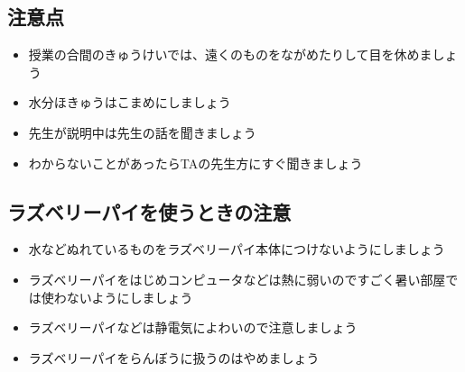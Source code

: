 \subsection{注意点}
\begin{itemize}
\item
授業の合間のきゅうけいでは、遠くのものをながめたりして目を休めましょう
\item 水分ほきゅうはこまめにしましょう
\item
先生が説明中は先生の話を聞きましょう
\item
わからないことがあったらTAの先生方にすぐ聞きましょう
\end{itemize}

\subsection{ラズベリーパイを使うときの注意}
\begin{itemize}
\item
水などぬれているものをラズベリーパイ本体につけないようにしましょう
\end{itemize}
\begin{itemize}
\item
ラズベリーパイをはじめコンピュータなどは熱に弱いのですごく暑い部屋では使わないようにしましょう
\end{itemize}
\begin{itemize}
\item
ラズベリーパイなどは静電気によわいので注意しましょう
\end{itemize}
\begin{itemize}
\item
ラズベリーパイをらんぼうに扱うのはやめましょう
\end{itemize}




\clearpage